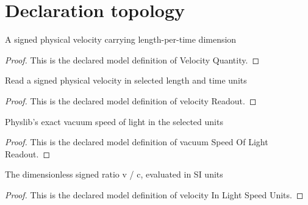 \section{Declaration topology}
\begin{definition}
  \label{def:physics:phyx-mini-0510:phyxminiproblems-problemphyxmini0510-velocityquantity}
  A signed physical velocity carrying length-per-time dimension
\end{definition}
\begin{proof}
  This is the declared model definition of Velocity Quantity.
\end{proof}
\begin{definition}
  \label{def:physics:phyx-mini-0510:phyxminiproblems-problemphyxmini0510-velocityreadout}
  Read a signed physical velocity in selected length and time units
\end{definition}
\begin{proof}
  This is the declared model definition of velocity Readout.
\end{proof}
\begin{definition}
  \label{def:physics:phyx-mini-0510:phyxminiproblems-problemphyxmini0510-vacuumspeedoflightreadout}
  Physlib's exact vacuum speed of light in the selected units
\end{definition}
\begin{proof}
  This is the declared model definition of vacuum Speed Of Light Readout.
\end{proof}
\begin{definition}
  \label{def:physics:phyx-mini-0510:phyxminiproblems-problemphyxmini0510-velocityinlightspeedunits}
  The dimensionless signed ratio v / c, evaluated in SI units
\end{definition}
\begin{proof}
  This is the declared model definition of velocity In Light Speed Units.
\end{proof}
